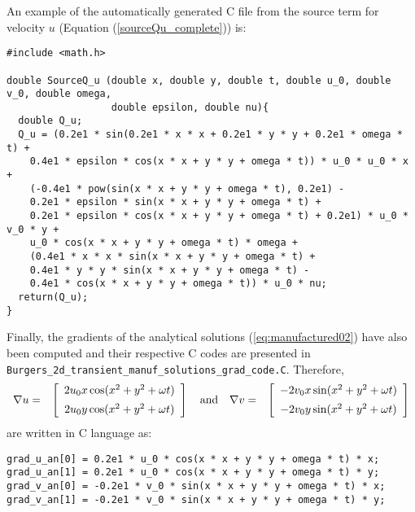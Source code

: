 \documentclass[10pt]{article}
\begin{document}
An example of the automatically generated C file from the source term for velocity $u$ (Equation (\ref{sourceQu_complete})) is:
\begin{verbatim}
#include <math.h>

double SourceQ_u (double x, double y, double t, double u_0, double v_0, double omega,
                  double epsilon, double nu){
  double Q_u;
  Q_u = (0.2e1 * sin(0.2e1 * x * x + 0.2e1 * y * y + 0.2e1 * omega * t) +
    0.4e1 * epsilon * cos(x * x + y * y + omega * t)) * u_0 * u_0 * x +
    (-0.4e1 * pow(sin(x * x + y * y + omega * t), 0.2e1) -
    0.2e1 * epsilon * sin(x * x + y * y + omega * t) +
    0.2e1 * epsilon * cos(x * x + y * y + omega * t) + 0.2e1) * u_0 * v_0 * y +
    u_0 * cos(x * x + y * y + omega * t) * omega +
    (0.4e1 * x * x * sin(x * x + y * y + omega * t) +
    0.4e1 * y * y * sin(x * x + y * y + omega * t) -
    0.4e1 * cos(x * x + y * y + omega * t)) * u_0 * nu;
  return(Q_u);
}
\end{verbatim}



Finally, the gradients of the analytical solutions (\ref{eq:manufactured02}) have also been computed and their respective C codes are presented in  \texttt{Burgers\_2d\_transient\_manuf\_solutions\_grad\_code.C}. Therefore,
\begin{equation}
\begin{array}{lll}
\nabla u =& \left[ \begin{array}{c}
 2  u_0 x \cos(x^2 + y^2 + \omega  t)  \vspace{5pt} \\
 2  u_0 y \cos(x^2 + y^2 + \omega  t) 
\end{array} \right]
\quad \mbox{and} \quad
\nabla v =& \left[ \begin{array}{c}
-2  v_0 x \sin(x^2 + y^2 + \omega  t) \vspace{5pt} \\
-2  v_0 y \sin(x^2 + y^2 + \omega  t)  
\end{array} \right]
\end{array}
\end{equation}
are written in C language as:
\begin{verbatim}
grad_u_an[0] = 0.2e1 * u_0 * cos(x * x + y * y + omega * t) * x;
grad_u_an[1] = 0.2e1 * u_0 * cos(x * x + y * y + omega * t) * y;
grad_v_an[0] = -0.2e1 * v_0 * sin(x * x + y * y + omega * t) * x;
grad_v_an[1] = -0.2e1 * v_0 * sin(x * x + y * y + omega * t) * y;
\end{verbatim}



 

\end{document}
